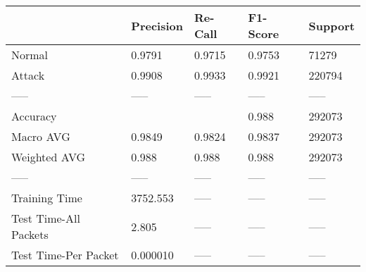 \begin{tabular}{lllll}
\toprule
{} & Precision & Re-Call & F1-Score & Support \\
\midrule
Normal                &    0.9791 &  0.9715 &   0.9753 &   71279 \\
Attack                &    0.9908 &  0.9933 &   0.9921 &  220794 \\
-----                 &     ----- &   ----- &    ----- &   ----- \\
Accuracy              &           &         &    0.988 &  292073 \\
Macro AVG             &    0.9849 &  0.9824 &   0.9837 &  292073 \\
Weighted AVG          &     0.988 &   0.988 &    0.988 &  292073 \\
-----                 &     ----- &   ----- &    ----- &   ----- \\
Training Time         &  3752.553 &   ----- &    ----- &   ----- \\
Test Time-All Packets &     2.805 &   ----- &    ----- &   ----- \\
Test Time-Per Packet  &  0.000010 &   ----- &    ----- &   ----- \\
\bottomrule
\end{tabular}
